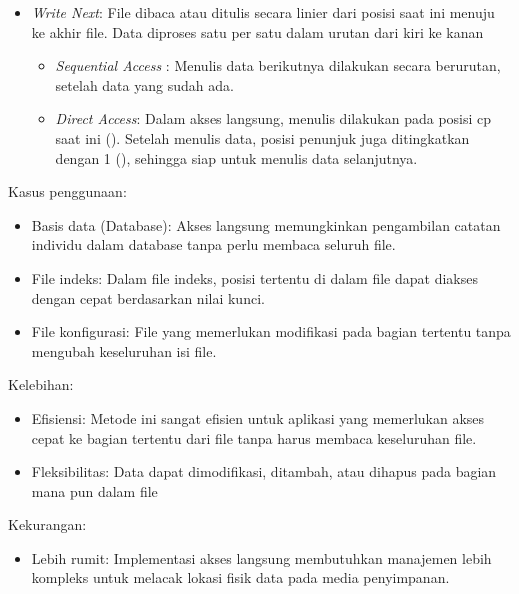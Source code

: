 \documentclass[12pt]{article}
\begin{document}
\begin{enumerate}
\begin{itemize}
\begin{itemize}
        \end{itemize}

        \item \textit{Write Next}: File dibaca atau ditulis secara linier dari posisi saat ini menuju ke akhir file. Data diproses satu per satu dalam urutan dari kiri ke kanan
         \begin{itemize}
        \item \textit{Sequential Access} : Menulis data berikutnya dilakukan secara berurutan, setelah data yang sudah ada.

            
        \item \textit{Direct Access}: Dalam akses langsung, menulis dilakukan pada posisi cp saat ini (). Setelah menulis data, posisi penunjuk juga ditingkatkan dengan 1 (), sehingga siap untuk menulis data selanjutnya.
        
        \end{itemize}

    \end{itemize}

    {Kasus penggunaan:}
     \begin{itemize}
        \item Basis data (Database): Akses langsung memungkinkan pengambilan catatan individu dalam database tanpa perlu membaca seluruh file.

        \item File indeks: Dalam file indeks, posisi tertentu di dalam file dapat diakses dengan cepat berdasarkan nilai kunci.

        \item File konfigurasi: File yang memerlukan modifikasi pada bagian tertentu tanpa mengubah keseluruhan isi file.


    \end{itemize}

    {Kelebihan:}
     \begin{itemize}
        \item Efisiensi: Metode ini sangat efisien untuk aplikasi yang memerlukan akses cepat ke bagian tertentu dari file tanpa harus membaca keseluruhan file.

        \item Fleksibilitas: Data dapat dimodifikasi, ditambah, atau dihapus pada bagian mana pun dalam file
    \end{itemize}

    {Kekurangan:}
     \begin{itemize}
        \item Lebih rumit: Implementasi akses langsung membutuhkan manajemen lebih kompleks untuk melacak lokasi fisik data pada media penyimpanan.


\end{itemize}
\end{enumerate}
\end{document}
